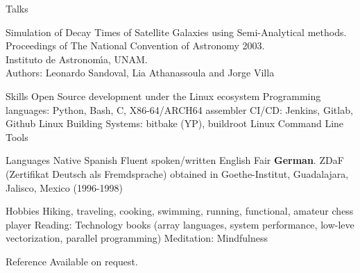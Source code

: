 \documentclass{resume}
\begin{document}

\begin{category}{Talks}

\citembullet Simulation of Decay Times of Satellite Galaxies using Semi-Analytical methods.\\
Proceedings of The National Convention of Astronomy 2003.\\
Instituto de Astronom\'{\i}a, UNAM. \\
Authors: Leonardo Sandoval, Lia Athanassoula and Jorge Villa
\end{category}

\begin{category}{Skills}
  \citembullet Open Source development under the Linux ecosystem
  \citembullet Programming languages: Python, Bash, C, X86-64/ARCH64 assembler
  \citembullet CI/CD: Jenkins, Gitlab, Github
  \citembullet Linux Building Systems: bitbake (YP), buildroot
  \citembullet Linux Command Line Tools
\end{category}

\begin{category}{Languages}
  \citembullet Native Spanish
  \citembullet Fluent spoken/written English
  \citembullet Fair \textbf{German}. ZDaF (Zertifikat Deutsch als Fremdsprache) obtained in Goethe-Institut, Guadalajara, Jalisco, Mexico (1996-1998)
\end{category}

\begin{category}{Hobbies}
  \citembullet Hiking, traveling, cooking, swimming, running, functional, amateur chess player
  \citembullet Reading: Technology books (array languages, system performance, low-leve vectorization, parallel programming)
  \citembullet Meditation: Mindfulness
\end{category}

\begin{category}{Reference} 
  \citemnobullet Available on request.
\end{category}
\end{document}
